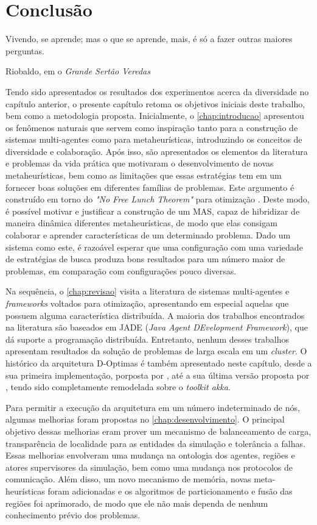 \chapter{Conclusão}
\label{chap:conclusao}

\epigraph{Vivendo, se aprende; mas o que se aprende, mais, é só a fazer outras maiores perguntas.}{Riobaldo, em o \textit{Grande Sertão Veredas}}

Tendo sido apresentados os resultados dos experimentos acerca da diversidade no capítulo anterior, o presente capítulo retoma os objetivos iniciais deste trabalho, bem como a metodologia proposta. Inicialmente, o \autoref{chap:introducao} apresentou os fenômenos naturais que servem como inspiração tanto para a construção de sistemas multi-agentes como para metaheurísticas, introduzindo os conceitos de diversidade e colaboração. Após isso, são apresentados os elementos da literatura e problemas da vida prática que motivaram o desenvolvimento de novas metaheurísticas, bem como as limitações que essas estratégias tem em um fornecer boas soluções em diferentes famílias de problemas. Este argumento é construído em torno do \textit{"No Free Lunch Theorem"} para otimização \cite{wolpert1997}. Deste modo, é possível motivar e justificar a construção de um MAS, capaz de hibridizar de maneira dinâmica diferentes  metaheurísticas, de modo que elas consigam colaborar e aprender características de um determinado problema. Dado um sistema como este, é razoável esperar que uma configuração com uma variedade de estratégias de busca produza bons resultados para um número maior de problemas, em comparação com configurações pouco diversas. 

Na sequência, o \autoref{chap:revisao} visita a literatura de sistemas multi-agentes e \textit{frameworks} voltados para otimização, apresentando em especial aquelas que  possuem alguma característica distribuída. A maioria dos trabalhos encontrados na literatura são baseados em JADE (\textit{Java Agent DEvelopment Framework}), que dá suporte a programação distribuída. Entretanto, nenhum desses trabalhos apresentam resultados da solução de problemas de larga escala em um \textit{cluster}. O histórico da arquitetura D-Optimas é também apresentado neste capítulo, desde a sua primeira implementação, porposta por , até a sua última versão proposta por , tendo sido completamente remodelada sobre o \textit{toolkit akka}.

Para permitir a execução da arquitetura em um número indeterminado de nós, algumas melhorias foram propostas no \autoref{chap:desenvolvimento}. O principal objetivo dessas melhorias eram prover um mecanismo de balanceamento de carga, transparência de localidade para as entidades da simulação e tolerância a falhas. Essas melhorias envolveram uma mudança na ontologia dos agentes, regiões e atores supervisores da simulação, bem como uma mudança nos protocolos de comunicação. Além disso, um novo mecanismo de memória, novas meta-heurísticas foram adicionadas e os algoritmos de particionamento e fusão das regiões foi aprimorado, de modo que ele não mais dependa de nenhum conhecimento prévio dos problemas.

